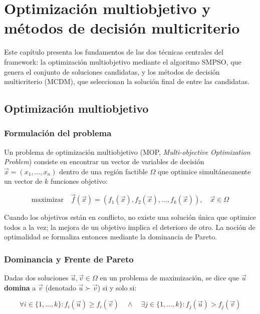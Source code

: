 \chapter{Optimización multiobjetivo y métodos de decisión multicriterio} %
\label{Chapter3}

Este capítulo presenta los fundamentos de las dos técnicas centrales del framework: la optimización multiobjetivo mediante el algoritmo SMPSO, que genera el conjunto de soluciones candidatas, y los métodos de decisión multicriterio (MCDM), que seleccionan la solución final de entre las candidatas.

\section{Optimización multiobjetivo}

\subsection{Formulación del problema}

Un problema de optimización multiobjetivo (MOP, \textit{Multi-objective Optimization Problem}) consiste en encontrar un vector de variables de decisión $\vec{x} = (x_1, \ldots, x_n)$ dentro de una región factible $\Omega$ que optimice simultáneamente un vector de $k$ funciones objetivo:

\begin{equation}
\text{maximizar} \quad \vec{f}(\vec{x}) = \left( f_1(\vec{x}), f_2(\vec{x}), \ldots, f_k(\vec{x}) \right), \quad \vec{x} \in \Omega
\label{eq:mop}
\end{equation}

Cuando los objetivos están en conflicto, no existe una solución única que optimice todos a la vez; la mejora de un objetivo implica el deterioro de otro. La noción de optimalidad se formaliza entonces mediante la dominancia de Pareto.

\subsection{Dominancia y Frente de Pareto}

Dadas dos soluciones $\vec{u}, \vec{v} \in \Omega$ en un problema de maximización, se dice que $\vec{u}$ \textbf{domina} a $\vec{v}$ (denotado $\vec{u} \succ \vec{v}$) si y solo si:

\begin{equation}
\forall i \in \{1, \ldots, k\}: f_i(\vec{u}) \geq f_i(\vec{v}) \quad \land \quad \exists j \in \{1, \ldots, k\}: f_j(\vec{u}) > f_j(\vec{v})
\label{eq:dominancia}
\end{equation}


